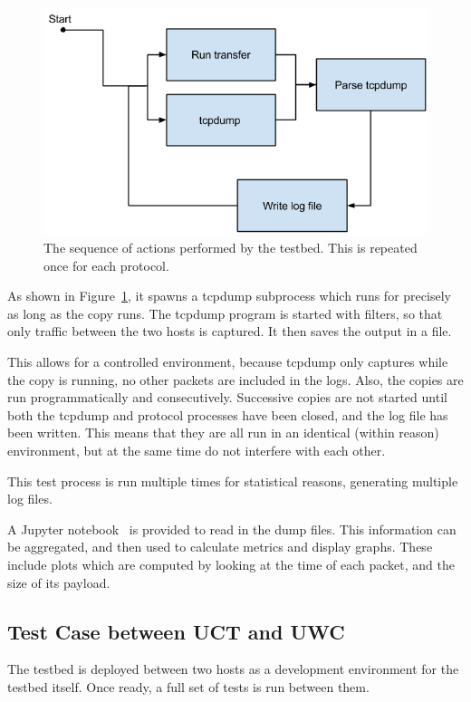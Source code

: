 \documentclass{sig-alternate-05-2015}
\begin{document}
\begin{figure}[t]
\centering
\includegraphics[width=\linewidth]{img/loop}
\caption{The sequence of actions performed by the testbed. This is repeated once for each protocol.\label{fig:testbed_sequence}}
\end{figure}

As shown in Figure~\ref{fig:testbed_sequence}, it spawns a tcpdump subprocess which runs for precisely as long as the copy runs. The tcpdump program is started with filters, so that only traffic between the two hosts is captured. It then saves the output in a file.

This allows for a controlled environment, because tcpdump only captures while the copy is running, no other packets are included in the logs. Also, the copies are run programmatically and consecutively. Successive copies are not started until both the tcpdump and protocol processes have been closed, and the log file has been written. This means that they are all run in an identical (within reason) environment, but at the same time do not interfere with each other.

This test process is run multiple times for statistical reasons, generating multiple log files.

A Jupyter notebook~\cite{jupyter} is provided to read in the dump files. This information can be aggregated, and then used to calculate metrics and display graphs. These include plots which are computed by looking at the time of each packet, and the size of its payload.

\subsection{Test Case between UCT and UWC}
The testbed is deployed between two hosts as a development environment for the testbed itself. Once ready, a full set of tests is run between them.
\end{document}
